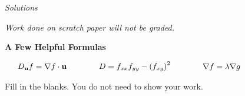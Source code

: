 \begin{center}
\ifnum {} {\Large {\color{DarkBlue}\textit{Solutions}}\\[6pt]}\fi
{\Large \TestName}
\end{center}

\begin{center}

\textit{Work done on scratch paper will not be graded.}

\vspace{12pt}

\textbf{A Few Helpful Formulas}

\vspace{6pt}

$
\begin{array}{lllllllll}
    & \displaystyle D_{\mathbf u} f = \nabla f \cdot \mathbf u
    & \qquad    
    & \displaystyle D = f_{xx}f_{yy} - \left(f_{xy}\right)^2
    & \qquad  
    & \displaystyle \nabla f = \lambda \nabla g  
    & \qquad
    & \displaystyle 
    & \qquad
\end{array} 
$
\end{center}
\begin{questions}
\question[0.5] \ID

\question[7] Fill in the blanks. You do not need to show your work. 
    
    \begin{parts}
        
        
        
        
        
          
          
    \end{parts}

\newpage \question[0.25] \ID


\newpage \question[0.25] \ID


\end{questions}